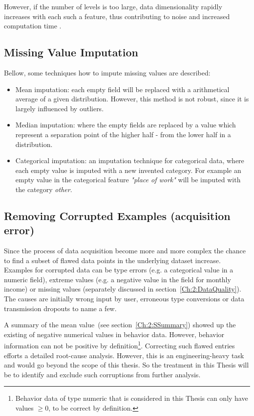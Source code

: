 However, if the number of levels is too large, data dimensionality rapidly increases with each such a feature, thus contributing to noise and increased computation time \cite{briscoef06}.



\subsection{Missing Value Imputation}\label{Ch:2:MVI} 
Bellow, some techniques how to impute missing values are described:
\begin{itemize}
    
        \item Mean imputation: each empty field will be replaced with a arithmetical average of a given distribution. However, this method is not robust, since it is largely influenced by outliers.
        
        \item Median imputation: where the empty fields are replaced by a value which represent a separation point of the higher half - from the lower half in a distribution. 
        
        \item Categorical imputation: an imputation technique for categorical data, where each empty value is imputed with a new invented category. For example an empty value in the categorical feature \textit{"place of work"} will be imputed with the category \textit{other}.

\end{itemize}



\subsection{Removing Corrupted Examples (acquisition error)}\label{Ch:2:RCD}
Since the process of data acquisition become more and more complex the chance to find a subset of flawed data points in the underlying dataset increase. Examples for corrupted data can be type errors (e.g. a categorical value in a numeric field), extreme values (e.g. a negative value in the field for monthly income) or missing values (separately discussed in section~\ref{Ch:2:DataQuality}). The causes are initially wrong input by user, erroneous type conversions or data transmission dropouts to name a few. 

A summary of the mean value~(see section~\ref{Ch:2:SSummary}) showed up the existing of negative numerical values in behavior data. However, behavior information can not be positive by definition\footnote{Behavior data of type numeric that is considered in this Thesis can only have values  \(\geq 0\), to be correct by definition.}.
Correcting such flawed entries efforts a detailed root-cause analysis. However, this is an engineering-heavy task and would go beyond the scope of this thesis. So the treatment in this Thesis will be to identify and exclude such corruptions from further analysis. 


